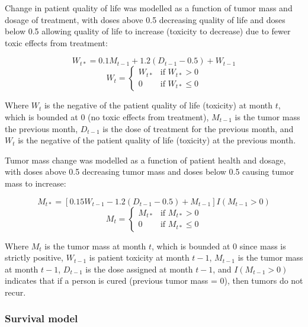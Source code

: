 \documentclass[12pt]{article}
\begin{document}
Change in patient quality of life was modelled as a function of tumor mass and dosage of treatment, with doses above 0.5 decreasing quality of life and doses below 0.5 allowing quality of life to increase (toxicity to decrease) due to fewer toxic effects from treatment:

\begin{equation}
W_{t*} = 0.1 M_{t-1} + 1.2 (D_{t-1} - 0.5) + W_{t - 1}
\end{equation}
\begin{equation}
W_{t} = \begin{cases}
  W_{t*} &\text{if } W_{t*} > 0 \\
  0 &\text{if } W_{t*} \leq 0
\end{cases}
\end{equation}

Where $W_{t}$ is the negative of the patient quality of life (toxicity) at month $t$, which is bounded at 0 (no toxic effects from treatment),
$M_{t-1}$ is the tumor mass the previous month,
$D_{t-1}$ is the dose of treatment for the previous month, and
$W_{t}$ is the negative of the patient quality of life (toxicity) at the previous month.

Tumor mass change was modelled as a function of patient health and dosage, with doses above 0.5 decreasing tumor mass and doses below 0.5 causing tumor mass to increase:

\begin{equation}
M_{t*} = [0.15 W_{t-1} - 1.2 (D_{t-1} - 0.5) + M_{t - 1}] I(M_{t-1} > 0)
\end{equation}
\begin{equation}
M_{t} = \begin{cases}
  M_{t*} &\text{if } M_{t*} > 0 \\
  0 &\text{if } M_{t*} \leq 0
\end{cases}
\end{equation}

Where $M_{t}$ is the tumor mass at month $t$, which is bounded at 0 since mass is strictly positive,
$W_{t-1}$ is patient toxicity at month $t - 1$,
$M_{t-1}$ is the tumor mass at month $t - 1$,
$D_{t-1}$ is the dose assigned at month $t - 1$, and
$I(M_{t-1} > 0)$ indicates that if a person is cured (previous tumor mass = 0), then tumors do not recur.


\subsubsection{Survival model} %
\label{ssub:survival_model}
\end{document}
